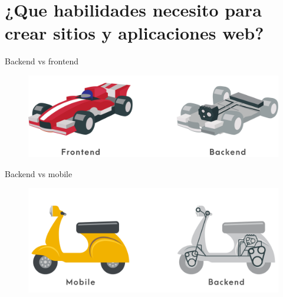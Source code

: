 \documentclass[aspectratio=169]{beamer}
\begin{document}
{
	\section{¿Que habilidades necesito para crear sitios y aplicaciones web?}
}


\begin{frame}{Backend vs frontend}
	\begin{figure}
		\centering
		\includegraphics[width=\linewidth]{Images/backvsfront}
	\end{figure}
\end{frame}



\begin{frame}{Backend vs mobile}
	\begin{figure}
		\centering
		\includegraphics[width=\linewidth]{Images/backvsmobile.png}
	\end{figure}
\end{frame}
\end{document}
